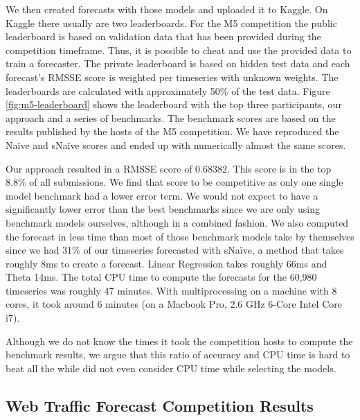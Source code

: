 We then created forecasts with those models and uploaded it to Kaggle. On Kaggle there usually are two leaderboards. For the M5 competition the public leaderboard is based on validation data that has been provided during the competition timeframe. Thus, it is possible to cheat and use the provided data to train a forecaster. The private leaderboard is based on hidden test data and each forecast's RMSSE score is weighted per timeseries with unknown weights. The leaderboards are calculated with approximately 50\% of the test data. Figure \ref{fig:m5-leaderboard} shows the leaderboard with the top three participants, our approach and a series of benchmarks. The benchmark scores are based on the results published by the hosts of the M5 competition. We have reproduced the Na\"ive and sNa\"ive scores and ended up with numerically almost the same scores.

Our approach resulted in a RMSSE score of 0.68382. This score is in the top 8.8\% of all submissions. We find that score to be competitive as only one single model benchmark had a lower error term. We would not expect to have a significantly lower error than the best benchmarks since we are only using benchmark models ourselves, although in a combined fashion. We also computed the forecast in less time than most of those benchmark models take by themselves since we had 31\% of our timeseries forecasted with sNa\"ive, a method that takes roughly 8ms to create a forecast. Linear Regression takes roughly 66ms and Theta 14ms. The total CPU time to compute the forecasts for the 60,980 timeseries was roughly 47 minutes. With multiprocessing on a machine with 8 cores, it took around 6 minutes (on a Macbook Pro, 2.6 GHz 6-Core Intel Core i7).

Although we do not know the times it took the competition hosts to compute the benchmark results, we argue that this ratio of accuracy and CPU time is hard to beat all the while did not even consider CPU time while selecting the models.

\subsection{Web Traffic Forecast Competition Results}

